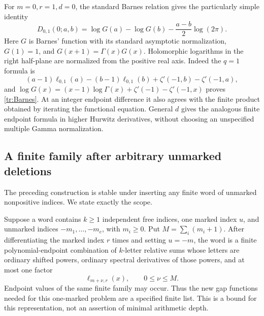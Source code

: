 For $m=0,r=1,d=0$, the standard Barnes relation
\cite{Vardi,DLMFBarnes} gives the particularly simple identity
\begin{equation}\label{tr:Barnes}
 \boxed{D_{0,1}(0;a,b)=
    \log G(a)-\log G(b)-\frac{a-b}{2}\log(2\pi).}
\end{equation}
Here $G$ is Barnes' function with its standard asymptotic normalization,
$G(1)=1$, and $G(x+1)=\Gamma(x)G(x)$. Holomorphic logarithms in the
right half-plane are normalized from the positive real axis.
Indeed the $q=1$ formula is
\[
 (a-1)\ell_{0,1}(a)-(b-1)\ell_{0,1}(b)
                    +\zeta'(-1,b)-\zeta'(-1,a),
\]
and
$\log G(x)=(x-1)\log\Gamma(x)+\zeta'(-1)-\zeta'(-1,x)$
proves \eqref{tr:Barnes}. At an integer endpoint difference it also
agrees with the finite product obtained by iterating the functional
equation. General $d$ gives the analogous finite endpoint formula in
higher Hurwitz derivatives, without choosing an unspecified multiple
Gamma normalization.

\subsection{A finite family after arbitrary unmarked deletions}

The preceding construction is stable under inserting any finite word
of unmarked nonpositive indices. We state exactly the scope.

\begin{proposition}
\label{tr:finitefamily}
Suppose a word contains $k\geq1$ independent free indices, one marked
index $u$, and unmarked indices $-m_1,\ldots,-m_e$, with $m_i\geq0$.
Put $M=\sum_i(m_i+1)$. After differentiating the marked index $r$ times
and setting $u=-m$, the word is a finite polynomial-endpoint combination
of $k$-letter relative sums whose letters are ordinary shifted powers,
ordinary spectral derivatives of those powers, and at most one factor
\[
 \ell_{m+\nu,r}(x),\qquad 0\leq\nu\leq M.
\]
Endpoint values of the same finite family may occur. Thus the new gap
functions needed for this one-marked problem are a specified finite
list. This is a bound for this representation, not an assertion of
minimal arithmetic depth.
\end{proposition}

